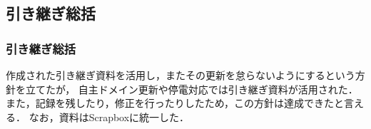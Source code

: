 \subsection*{引き継ぎ総括}


\subsubsection*{引き継ぎ総括}
作成された引き継ぎ資料を活用し，またその更新を怠らないようにするという方針を立てたが，
自主ドメイン更新や停電対応では引き継ぎ資料が活用された．
また，記録を残したり，修正を行ったりしたため，この方針は達成できたと言える．
なお，資料はScrapboxに統一した．
